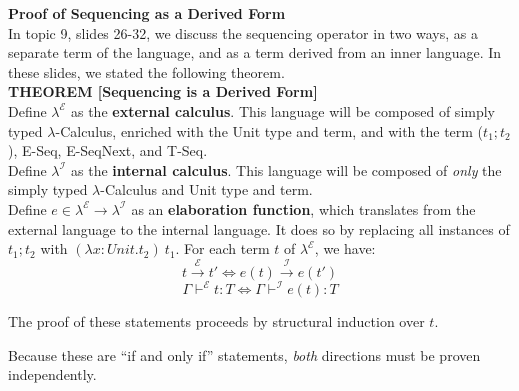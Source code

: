 \documentclass{exam}
\let\OldTexttt\texttt
\renewcommand{\texttt}[1]{\OldTexttt{\color{teal}{#1}}}
\begin{document}
\begin{center}
\end{center}

\begin{questions}
\question \textbf{Proof of Sequencing as a Derived Form} \\ 
In topic 9, slides 26-32, we discuss the sequencing operator \texttt{;} in two ways, as a separate term of the language, and as a term derived from an inner language.  In these slides, we stated the following theorem. \\ 

\textbf{THEOREM [Sequencing is a Derived Form]} \\
Define $\lambda^\mathcal{E}$ as the \textbf{external calculus}.  This language will be composed of simply typed $\lambda$-Calculus, enriched with the Unit type and term, and with the term ($t_1 ; t_2$), E-Seq, E-SeqNext, and T-Seq. \\

Define $\lambda^\mathcal{I}$ as the \textbf{internal calculus}.  This language will be composed of \emph{only} the simply typed $\lambda$-Calculus and Unit type and term. \\

Define $e \in \lambda^\mathcal{E} \rightarrow \lambda^\mathcal{I}$ as an \textbf{elaboration function}, which translates from the external language to the internal language.  It does so by replacing all instances of $t_1 ; t_2$ with $(\lambda x : Unit.t_2)\:t_1$. For each term $t$ of $\lambda^\mathcal{E}$, we have:
\begin{equation}
t \xrightarrow{\mathcal{E}} t' \iff e(t) \xrightarrow{\mathcal{I}} e(t')
\end{equation}
\begin{equation}
\Gamma \vdash^{\mathcal{E}} t : T \iff \Gamma \vdash^{\mathcal{I}} e(t) : T
\end{equation}

The proof of these statements proceeds by structural induction over $t$.  

Because these are ``if and only if'' statements, \emph{both} directions must be proven independently.  

\end{questions}
\end{document}
